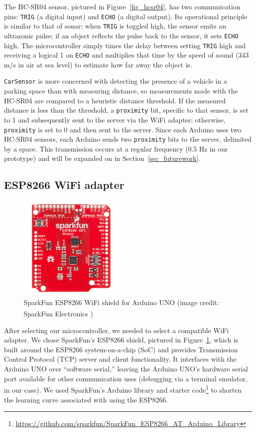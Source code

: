 \documentclass[conference]{IEEEtran}
\begin{document}
The HC-SR04 sensor, pictured in Figure~\ref{fig_hcsr04}, has two communication pins: \texttt{TRIG} (a digital input) and \texttt{ECHO} (a digital output). Its operational principle is similar to that of sonar: when \texttt{TRIG} is toggled high, the sensor emits an ultrasonic pulse; if an object reflects the pulse back to the sensor, it sets \texttt{ECHO} high. The microcontroller simply times the delay between setting \texttt{TRIG} high and receiving a logical 1 on \texttt{ECHO} and multiplies that time by the speed of sound (343 m/s in air at sea level) to estimate how far away the object is.

\texttt{CarSensor} is more concerned with detecting the presence of a vehicle in a parking space than with measuring distance, so measurements made with the HC-SR04 are compared to a heuristic distance threshold. If the measured distance is less than the threshold, a \texttt{proximity} bit, specific to that sensor, is set to 1 and subsequently sent to the server via the WiFi adapter; otherwise, \texttt{proximity} is set to 0 and then sent to the server. Since each Arduino uses two HC-SR04 sensors, each Arduino sends two \texttt{proximity} bits to the server, delimited by a space. This transmission occurs at a regular frequency (0.5 Hz in our prototype) and will be expanded on in Section~\ref{sec_futurework}.

\subsection{ESP8266 WiFi adapter}

\begin{figure}[h]
	\centering
	\includegraphics[width=2.0in]{esp8266.jpg}
	\caption{SparkFun ESP8266 WiFi shield for Arduino UNO (image credit: SparkFun Electronics \textsuperscript{\textregistered})}
	\label{fig_esp8266}
\end{figure}

After selecting our microcontroller, we needed to select a compatible WiFi adapter. We chose SparkFun's ESP8266 shield, pictured in Figure~\ref{fig_esp8266}, which is built around the ESP8266 system-on-a-chip (SoC) and provides Transmission Control Protocol (TCP) server and client functionality. It interfaces with the Arduino UNO over ``software serial,'' leaving the Arduino UNO's hardware serial port available for other communication uses (debugging via a terminal emulator, in our case). We used SparkFun's Arduino library and starter code\footnote{\url{https://github.com/sparkfun/SparkFun_ESP8266_AT_Arduino_Library}} to shorten the learning curve associated with using the ESP8266.
\end{document}
